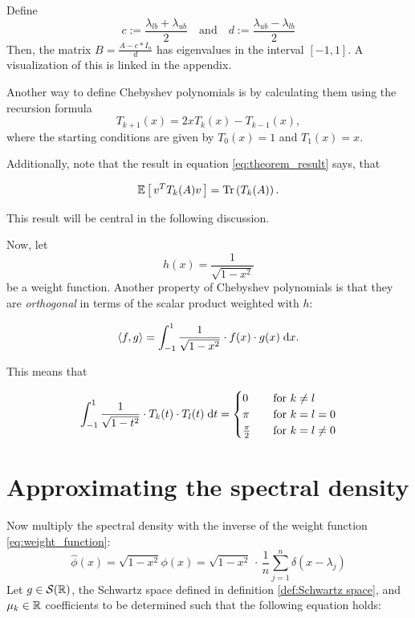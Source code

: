 Define
\[
c := \frac{\lambda_{lb} + \lambda_{ub}}{2} \quad \text{and} \quad d := \frac{\lambda_{ub} - \lambda_{lb}}{2}
\]
Then, the matrix $B = \frac{A - c*I_n}{d}$ has eigenvalues in the interval $[-1, 1]$.
A visualization of this is linked in the appendix.


Another way to define Chebyshev polynomials is by calculating them using the recursion formula
\[
T_{k + 1}(x) = 2xT_k(x) - T_{k - 1}(x),
\]
where the starting conditions are given by $T_0(x) = 1$ and $T_1(x) = x$.

Additionally, note that the result in equation \ref{eq:theorem_result} says, that

\begin{equation} \label{eq:Chebyshev_trace}
    \mathbb{E}\left[\,v^T T_k(A) v\,\right] = \operatorname{Tr}\left(T_k(A)\right).
\end{equation}

This result will be central in the following discussion.


Now, let
\begin{equation} \label{eq:weight_function}
    h(x) = \frac{1}{\sqrt{1 - x^2}}
\end{equation}
be a weight function.
Another property of Chebyshev polynomials is
that they are \emph{orthogonal} in terms of the scalar product weighted with $h$:

\[
\left \langle f, g \right \rangle = \int_{-1}^1 \frac{1}{\sqrt{1 - x^2}} \cdot f(x) \cdot g(x) \;\mathrm{d}x.
\]

This means that

\[
\int_{-1}^1 \frac{1}{\sqrt{1 - t^2}} \cdot T_k(t) \cdot T_l(t) \;\mathrm{d}t =
\begin{cases}
    0               & \quad \text{for } k \neq l\\
    \pi             & \quad \text{for } k = l = 0\\
    \frac{\pi}{2}   & \quad \text{for } k = l \neq 0
\end{cases}
\]

\section{Approximating the spectral density}
Now multiply the spectral density with the inverse of the weight function \ref{eq:weight_function}:
\[
\hat{\phi}(x) = \sqrt{1 - x^2} \phi(x) = \sqrt{1 - x^2} \, \cdot \, \frac{1}{n} \sum_{j = 1}^n \delta(x - \lambda_j)
\]
Let $g \in \mathcal{S}(\mathbb{R})$, the Schwartz space defined in definition \ref{def:Schwartz space},
and $\mu_k \in \mathbb{R}$ coefficients to be determined such that the following equation holds:

